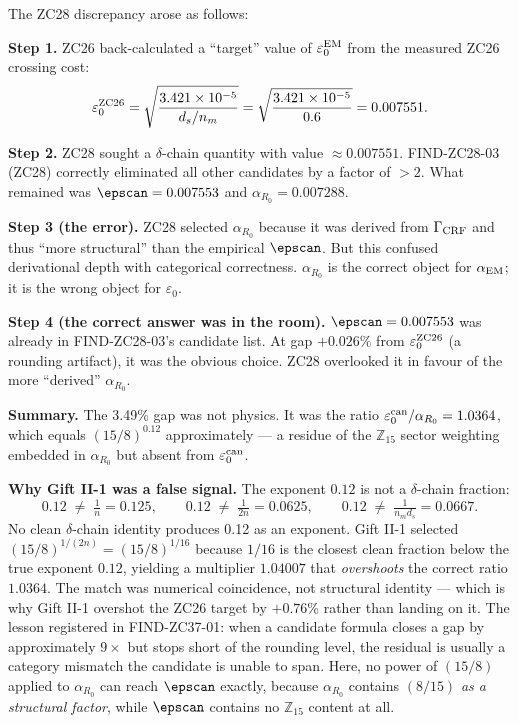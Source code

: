 \documentclass[12pt, a4paper]{article}
\begin{document}
\begin{derivedbox}[title={Anatomy of the 3.49\% discrepancy
  (GAP-ZC28-01 post-mortem)}]
The ZC28 discrepancy arose as follows:

\medskip
\textbf{Step 1.} ZC26 back-calculated a ``target'' value of
$\varepsilon_0^{\rm EM}$ from the measured ZC26 crossing cost:
\[
  \varepsilon_0^{\rm ZC26}
  = \sqrt{\frac{3.421\times10^{-5}}{d_s/n_m}}
  = \sqrt{\frac{3.421\times10^{-5}}{0.6}}
  = 0.007551.
\]

\textbf{Step 2.} ZC28 sought a $\delta$-chain quantity with
value $\approx 0.007551$. FIND-ZC28-03 (ZC28) correctly
eliminated all other candidates by a factor of $> 2$.
What remained was $\epscan = 0.007553$ and
$\alpha_{R_0} = 0.007288$.

\textbf{Step 3 (the error).} ZC28 selected $\alpha_{R_0}$
because it was derived from $\Gamma_{\rm CRF}$ and thus
``more structural'' than the empirical $\epscan$.
But this confused derivational depth with categorical
correctness. $\alpha_{R_0}$ is the correct object for
$\alpha_{\rm EM}$; it is the wrong object for $\varepsilon_0$.

\textbf{Step 4 (the correct answer was in the room).}
$\epscan = 0.007553$ was already in FIND-ZC28-03's
candidate list. At gap $+0.026\%$ from $\varepsilon_0^{\rm ZC26}$
(a rounding artifact), it was the obvious choice.
ZC28 overlooked it in favour of the more ``derived'' $\alpha_{R_0}$.

\textbf{Summary.}
The 3.49\% gap was not physics. It was the ratio
$\varepsilon_0^{\rm can}/\alpha_{R_0} = 1.0364$,
which equals $(15/8)^{0.12}$ approximately --- a residue
of the $\mathbb{Z}_{15}$ sector weighting embedded in
$\alpha_{R_0}$ but absent from $\varepsilon_0^{\rm can}$.

\medskip
\textbf{Why Gift II-1 was a false signal.}
The exponent $0.12$ is not a $\delta$-chain fraction:
\[
  0.12 \;\neq\; \tfrac{1}{n} = 0.125,
  \qquad
  0.12 \;\neq\; \tfrac{1}{2n} = 0.0625,
  \qquad
  0.12 \;\neq\; \tfrac{1}{n_m d_s} = 0.0667.
\]
No clean $\delta$-chain identity produces 0.12 as an
exponent. Gift II-1 selected $(15/8)^{1/(2n)} = (15/8)^{1/16}$
because $1/16$ is the closest clean fraction below the true
exponent $0.12$, yielding a multiplier $1.04007$ that
\emph{overshoots} the correct ratio $1.0364$. The match
was numerical coincidence, not structural identity ---
which is why Gift II-1 overshot the ZC26 target by $+0.76\%$
rather than landing on it.
The lesson registered in FIND-ZC37-01: when a candidate
formula closes a gap by approximately $9\times$ but stops
short of the rounding level, the residual is usually a
category mismatch the candidate is unable to span. Here,
no power of $(15/8)$ applied to $\alpha_{R_0}$ can reach
$\epscan$ exactly, because $\alpha_{R_0}$ contains $(8/15)$
\emph{as a structural factor}, while $\epscan$ contains no
$\mathbb{Z}_{15}$ content at all.
\end{derivedbox}
\end{document}
